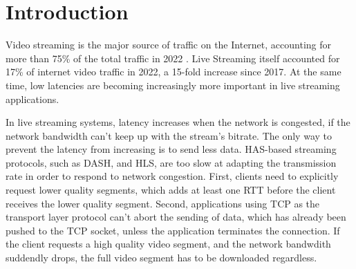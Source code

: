 
\chapter{Introduction}\label{chapter:introduction}

Video streaming is the major source of traffic on the Internet, accounting for more than 75\% of the total traffic in 2022 \parencite{CiscoVisualNetworking2018}. Live Streaming itself accounted for 17\% of internet video traffic in 2022, a 15-fold increase since 2017. At the same time, low latencies are becoming increasingly more important in live streaming applications.

In live streaming systems, latency increases when the network is congested, if the network bandwidth can't keep up with the stream's bitrate. The only way to prevent the latency from increasing is to send less data. \acs{HAS}-based streaming protocols, %
such as \ac{DASH}, and \ac{HLS}, are too slow at adapting the transmission rate in order to respond to network congestion. First, clients need to explicitly request lower quality segments, which adds at least one \ac{RTT} before the client receives the lower quality segment. Second, applications using TCP as the transport layer protocol can't abort the sending of data, which has already been pushed to the TCP socket, unless the application terminates the connection. If the client requests a high quality video segment, and the network bandwdith suddendly drops, the full video segment has to be downloaded regardless. %



